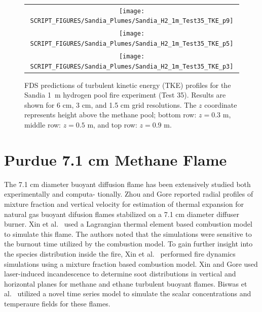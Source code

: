 \begin{figure}[p]
\begin{center}
\begin{tabular}{c}
\texttt{[image: SCRIPT\_FIGURES/Sandia\_Plumes/Sandia\_H2\_1m\_Test35\_TKE\_p9]} \\
\texttt{[image: SCRIPT\_FIGURES/Sandia\_Plumes/Sandia\_H2\_1m\_Test35\_TKE\_p5]} \\
\texttt{[image: SCRIPT\_FIGURES/Sandia\_Plumes/Sandia\_H2\_1m\_Test35\_TKE\_p3]}
\end{tabular}
\caption[Sandia 1~m hydrogen pool fire (Test 25) turbulent kinetic energy]
{FDS predictions of turbulent kinetic energy (TKE) profiles for the Sandia 1~m hydrogen pool fire experiment (Test 35). Results are shown for 6 cm, 3 cm, and 1.5 cm grid resolutions. The $z$ coordinate represents height above the methane pool; bottom row: $z=0.3$ m, middle row: $z=0.5$ m, and top row: $z=0.9$ m.}
\label{Sandia_H2_1m_Test35_tke}
\end{center}
\end{figure}


\clearpage

\section{Purdue 7.1 cm Methane Flame}
\label{Purdue_Flames}

The 7.1 cm diameter buoyant diffusion flame has been extensively studied both experimentally and computa- tionally. Zhou and Gore \cite{Zhou:CS1998} reported radial profiles of mixture fraction and vertical velocity for estimation of thermal expansion for natural gas buoyant difusion flames stabilized on a 7.1 cm diameter diffuser burner. Xin et al.~\cite{Xin:CSS2002} used a Lagrangian thermal element based combustion model to simulate this flame. The authors noted that the simulations were sensitive to the burnout time utilized by the combustion model. To gain further insight into the species distribution inside the fire, Xin et al.~\cite{Xin:CF2005} performed fire dynamics simulations using a mixture fraction based combustion model. Xin and Gore \cite{Xin:CS2005} used laser-induced incandescence to determine soot distributions in vertical and horizontal planes for methane and ethane turbulent buoyant flames. Biswas et al.~\cite{Biswas:CS2007} utilized a novel time series model to simulate the scalar concentrations and temperaure fields for these flames.

